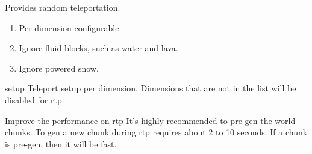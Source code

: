 
Provides random teleportation.

\begin{enumerate}
    \item Per dimension configurable.
    \item Ignore fluid blocks, such as water and lava.
    \item Ignore powered snow.
\end{enumerate}


\begin{Configuration}
    \item[setup]{
        Teleport setup per dimension.
        Dimensions that are not in the list will be disabled for rtp.
    }
\end{Configuration}


\begin{tips}{Improve the performance on rtp}
    It's highly recommended to pre-gen the world chunks.
    To gen a new chunk during rtp requires about 2 to 10 seconds.
    If a chunk is pre-gen, then it will be fast.
\end{tips}


